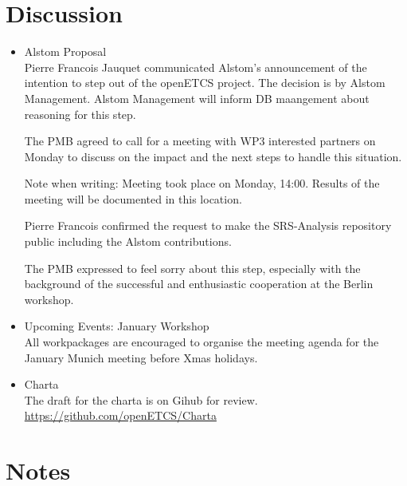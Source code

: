 \documentclass[a4paper, 11pt]{article}
\begin{document}
\section{Discussion}
\begin{itemize}

\item Alstom Proposal\\
Pierre Francois Jauquet communicated Alstom's announcement of the intention to step out of the openETCS project. The decision is by Alstom Management. Alstom Management will inform DB maangement about reasoning for this step.

The PMB agreed to call for a meeting with WP3 interested partners on Monday to discuss on the impact and the next steps to handle this situation.

Note when writing: Meeting took place on Monday, 14:00. Results of the meeting will be documented in this location.

Pierre Francois confirmed the request to make the SRS-Analysis repository public including the Alstom contributions. 

The PMB expressed to feel sorry about this step, especially with the background of the successful and enthusiastic cooperation at the Berlin workshop.

\item Upcoming Events: January Workshop\\
All workpackages are encouraged to organise the meeting agenda for the January Munich meeting before Xmas holidays.

\item Charta\\
The draft for the charta is on Gihub for review.
\url{https://github.com/openETCS/Charta}

\end{itemize}

\section{Notes}
\end{document}
